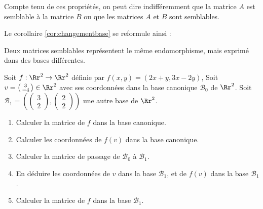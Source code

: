\documentclass[class=report,crop=false]{standalone}
\begin{document}
Compte tenu de ces propriétés, on peut dire indifféremment que la
matrice $A$ est semblable à la matrice $B$ ou que les matrices $A$ et $B$ sont
semblables.

Le corollaire \ref{cor:changementbase} se reformule ainsi :
\begin{corollaire}
Deux matrices semblables représentent le même endomorphisme, mais exprimé dans
des bases différentes.
\end{corollaire}



\begin{miniexercices}
Soit $f : \Rr^2 \to \Rr^2$ définie par $f(x,y) = (2x+y,3x-2y)$,
Soit $v = \left(\begin{smallmatrix}3\\-4\end{smallmatrix}\right) \in \Rr^2$
avec ses coordonnées dans la base canonique $\mathcal{B}_0$ de $\Rr^2$.
Soit $\mathcal{B}_1 = \left(
\left(\begin{smallmatrix}3\\2\end{smallmatrix}\right),
\left(\begin{smallmatrix}2\\2\end{smallmatrix}\right)
\right)$ une autre base de $\Rr^2$.
\begin{enumerate}
  \item Calculer la matrice de $f$ dans la base canonique.

  \item Calculer les coordonnées de $f(v)$ dans la base canonique.

  \item Calculer la matrice de passage de $\mathcal{B}_0$ à $\mathcal{B}_1$.

  \item En déduire les coordonnées de $v$ dans la base $\mathcal{B}_1$,
  et de $f(v)$ dans la base $\mathcal{B}_1$.

  \item Calculer la matrice de $f$ dans la base $\mathcal{B}_1$.
\end{enumerate}



\end{miniexercices}
\end{document}
